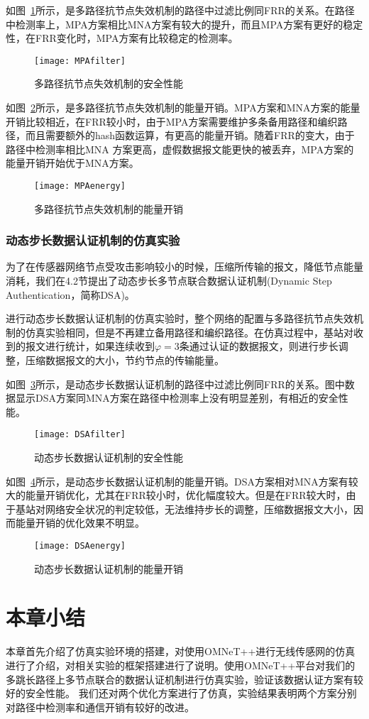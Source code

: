如图~\ref{fig:MPAfilter}所示，是多路径抗节点失效机制的路径中过滤比例同FRR的关系。在路径中检测率上，MPA方案相比MNA方案有较大的提升，而且MPA方案有更好的稳定性，在FRR变化时，MPA方案有比较稳定的检测率。
\begin{figure}[htbp]
  \centering
  \texttt{[image: MPAfilter]}
  \caption{多路径抗节点失效机制的安全性能}
  \label{fig:MPAfilter}
\end{figure}

如图~\ref{fig:MPAenergy}所示，是多路径抗节点失效机制的能量开销。MPA方案和MNA方案的能量开销比较相近，在FRR较小时，由于MPA方案需要维护多条备用路径和编织路径，而且需要额外的hash函数运算，有更高的能量开销。随着FRR的变大，由于路径中检测率相比MNA 方案更高，虚假数据报文能更快的被丢弃，MPA方案的能量开销开始优于MNA方案。
\begin{figure}[htbp]
  \centering
  \texttt{[image: MPAenergy]}
  \caption{多路径抗节点失效机制的能量开销}
  \label{fig:MPAenergy}
\end{figure}


\subsubsection{动态步长数据认证机制的仿真实验}
为了在传感器网络节点受攻击影响较小的时候，压缩所传输的报文，降低节点能量消耗，我们在4.2节提出了动态步长多节点联合数据认证机制(Dynamic Step Authentication，简称DSA)。

进行动态步长数据认证机制的仿真实验时，整个网络的配置与多路径抗节点失效机制的仿真实验相同，但是不再建立备用路径和编织路径。在仿真过程中，基站对收到的报文进行统计，如果连续收到$\varphi = 3$条通过认证的数据报文，则进行步长调整，压缩数据报文的大小，节约节点的传输能量。

如图~\ref{fig:DSAfilter}所示，是动态步长数据认证机制的路径中过滤比例同FRR的关系。图中数据显示DSA方案同MNA方案在路径中检测率上没有明显差别，有相近的安全性能。
\begin{figure}[htbp]
  \centering
  \texttt{[image: DSAfilter]}
  \caption{动态步长数据认证机制的安全性能}
  \label{fig:DSAfilter}
\end{figure}

如图~\ref{fig:DSAenergy}所示，是动态步长数据认证机制的能量开销。DSA方案相对MNA方案有较大的能量开销优化，尤其在FRR较小时，优化幅度较大。但是在FRR较大时，由于基站对网络安全状况的判定较低，无法维持步长的调整，压缩数据报文大小，因而能量开销的优化效果不明显。
\begin{figure}[htbp]
  \centering
  \texttt{[image: DSAenergy]}
  \caption{动态步长数据认证机制的能量开销}
  \label{fig:DSAenergy}
\end{figure}


\section{本章小结}
本章首先介绍了仿真实验环境的搭建，对使用OMNeT++进行无线传感网的仿真进行了介绍，对相关实验的框架搭建进行了说明。使用OMNeT++平台对我们的多跳长路径上多节点联合的数据认证机制进行仿真实验，验证该数据认证方案有较好的安全性能。
我们还对两个优化方案进行了仿真，实验结果表明两个方案分别对路径中检测率和通信开销有较好的改进。
